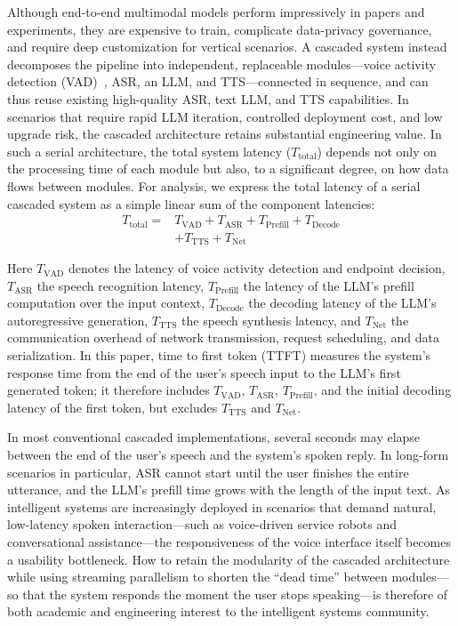 \documentclass[conference]{IEEEtran}
\begin{document}
Although end-to-end multimodal models perform impressively in papers and experiments, they are expensive to train, complicate data-privacy governance, and require deep customization for vertical scenarios. A cascaded system instead decomposes the pipeline into independent, replaceable modules---voice activity detection (VAD)~\cite{ref2}, ASR, an LLM, and TTS---connected in sequence, and can thus reuse existing high-quality ASR, text LLM, and TTS capabilities. In scenarios that require rapid LLM iteration, controlled deployment cost, and low upgrade risk, the cascaded architecture retains substantial engineering value. In such a serial architecture, the total system latency ($T_{\mathrm{total}}$) depends not only on the processing time of each module but also, to a significant degree, on how data flows between modules. For analysis, we express the total latency of a serial cascaded system as a simple linear sum of the component latencies:
\begin{align}
T_{\mathrm{total}} ={}& T_{\mathrm{VAD}} + T_{\mathrm{ASR}} + T_{\mathrm{Prefill}} + T_{\mathrm{Decode}} \nonumber\\
& + T_{\mathrm{TTS}} + T_{\mathrm{Net}}
\label{eq:total}
\end{align}

Here $T_{\mathrm{VAD}}$ denotes the latency of voice activity detection and endpoint decision, $T_{\mathrm{ASR}}$ the speech recognition latency, $T_{\mathrm{Prefill}}$ the latency of the LLM's prefill computation over the input context, $T_{\mathrm{Decode}}$ the decoding latency of the LLM's autoregressive generation, $T_{\mathrm{TTS}}$ the speech synthesis latency, and $T_{\mathrm{Net}}$ the communication overhead of network transmission, request scheduling, and data serialization. In this paper, time to first token (TTFT) measures the system's response time from the end of the user's speech input to the LLM's first generated token; it therefore includes $T_{\mathrm{VAD}}$, $T_{\mathrm{ASR}}$, $T_{\mathrm{Prefill}}$, and the initial decoding latency of the first token, but excludes $T_{\mathrm{TTS}}$ and $T_{\mathrm{Net}}$.

In most conventional cascaded implementations, several seconds may elapse between the end of the user's speech and the system's spoken reply. In long-form scenarios in particular, ASR cannot start until the user finishes the entire utterance, and the LLM's prefill time grows with the length of the input text. As intelligent systems are increasingly deployed in scenarios that demand natural, low-latency spoken interaction---such as voice-driven service robots and conversational assistance---the responsiveness of the voice interface itself becomes a usability bottleneck. How to retain the modularity of the cascaded architecture while using streaming parallelism to shorten the ``dead time'' between modules---so that the system responds the moment the user stops speaking---is therefore of both academic and engineering interest to the intelligent systems community.
\end{document}
